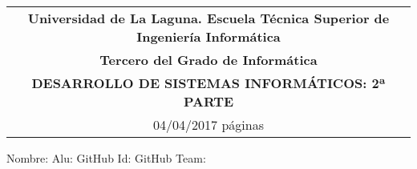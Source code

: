 \documentclass[]{article}
\date{}
\begin{document}
\thispagestyle{empty}
  \begin{tabular}{c}
   {\bf Universidad de La Laguna.  Escuela Técnica Superior de Ingeniería Informática}     \\
   {\bf Tercero del Grado de Informática}\\
   {\bf DESARROLLO DE SISTEMAS INFORMÁTICOS: 2ª PARTE}\\
   04/04/2017  \pageref*{LastPage} páginas         \\   
  \end{tabular}                     %

\bigskip

Nombre:  \underline{\hspace{10.5cm}} 
Alu: \underline{\hspace{2cm}} 
GitHub Id: \underline{\hspace{2cm}} 
GitHub Team: \underline{\hspace{2cm}} 
\bigskip





%

%

%

%

%

%

%







%

%
\end{document}
